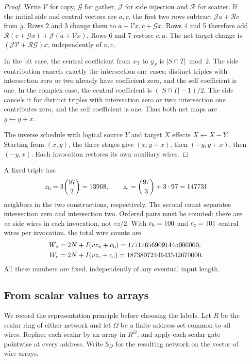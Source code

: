 \begin{proof}
Write $\mathcal V$ for copy, $\mathcal G$ for gather,
$\mathcal J$ for side injection and $\mathcal R$ for scatter.
If the initial side and central vectors are $a,c$, the first two rows
subtract $\mathcal J a+\mathcal R c$ from $y$.  Rows 2 and 3 change
them to $a+\mathcal Vx,c+\mathcal Gx$.  Rows 4 and 5 therefore add
$\mathcal R(c+\mathcal Gx)+\mathcal J(a+\mathcal Vx)$.
Rows 6 and 7 restore $c,a$.  The net target change is
$(\mathcal J\mathcal V+\mathcal R\mathcal G)x$, independently of
$a,c$.

In the bit case, the central coefficient from $x_T$ to $y_S$ is
$|S\cap T|\bmod2$.  The side contribution cancels exactly the
intersection-one cases; distinct triples with intersection zero or two
already have coefficient zero, and the self coefficient is one.
In the complex case, the central coefficient is $(|S\cap T|-1)/2$.
The side cancels it for distinct triples with intersection zero or two;
intersection one contributes zero, and the self coefficient is one.
Thus both net maps are $y\gets y+x$.

The inverse schedule with logical source $Y$ and target $X$ effects
$X\gets X-Y$.  Starting from $(x,y)$, the three stages give
$(x,y+x)$, then $(-y,y+x)$, then $(-y,x)$.
Each invocation restores its own auxiliary wires.
\end{proof}

A fixed triple has
\[
 z_{\rm b}=3\binom{97}{2}=13968,\qquad
 z_{\rm c}=\binom{97}{3}+3\cdot97=147731
\]
neighbors in the two constructions, respectively.  The second count
separates intersection zero and intersection two.  Ordered pairs must
be counted: there are $vz$ side wires in each invocation, not $vz/2$.
With $c_{\rm b}=100$ and $c_{\rm c}=101$ central wires per invocation,
the total wire counts are
\begin{align}
 W_{\rm b}&=2N+I(vz_{\rm b}+c_{\rm b})
          =177176569091445000000,\label{eq:bit-wire-count}\\
 W_{\rm c}&=2N+I(vz_{\rm c}+c_{\rm c})
          =1873807244643542670000.\label{eq:complex-wire-count}
\end{align}
All these numbers are fixed, independently of any eventual input length.

\subsection{From scalar values to arrays}

We record the representation principle before choosing the labels.  Let
$R$ be the scalar ring of either network and let $\Omega$ be a finite address
set common to all wires.  Replace each scalar by an array in $R^\Omega$, and
apply each scalar gate pointwise at every address.  Write $\mathsf S_\Omega$
for the resulting network on the vector of wire arrays.

